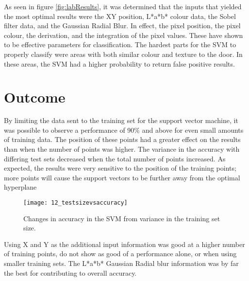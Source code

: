 As seen in figure \ref{fig:labResults}, it was determined that the inputs that yielded the most optimal results were the XY position, L*a*b* colour data, the Sobel filter data, and the Gaussian Radial Blur. In effect, the pixel position, the pixel colour, the derivation, and the integration of the pixel values. These have shown to be effective parameters for classification. The hardest parts for the SVM to properly classify were areas with both similar colour and texture to the door. In these areas, the SVM had a higher probability to return false positive results.

\section{Outcome}

By limiting the data sent to the training set for the support vector machine, it was possible to observe a performance of 90\% and above for even small amounts of training data. The position of these points had a greater effect on the results than when the number of points was higher. The variance in the accuracy with differing test sets decreased when the total number of points increased. As expected, the results were very sensitive to the position of the training points; more points will cause the support vectors to be further away from the optimal hyperplane

\begin{figure}[ht]
    \centering
    \texttt{[image: 12\_testsizevsaccuracy]}
    \caption{Changes in accuracy in the SVM from variance in the training set size.}
    \label{fig:12_testsizevsaccuracy}
\end{figure}

Using X and Y as the additional input information was good at a higher number of training points, do not show as good of a performance alone, or when using smaller training sets. The L*a*b* Gaussian Radial blur information was by far the best for contributing to overall accuracy. 

